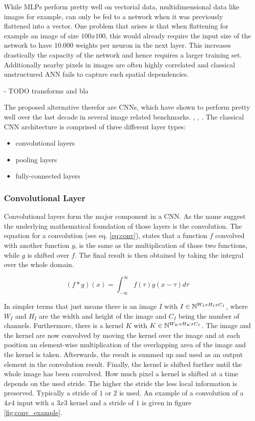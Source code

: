While \acp{MLP} perform pretty well on vectorial data, multidimensional data like images for example, can only be fed to a network when it was previously flattened into a vector.
One problem that arises is that when flattening for example an image of size $100x100$, this would already require the input size of the network to have $10.000$ weights per neuron in the next layer.
This increases drastically the capacity of the network and hence requires a larger training set.
Additionally nearby pixels in images are often highly correlated and classical unstructured \ac{ANN} fails to capture such spatial dependencies. \cite{lecun_lenet}

- TODO transforms and bla

The proposed alternative therefor are \acp{CNN}, which have shown to perform pretty well over the last decade in several image related benchmarks. \cite{inception}, \cite{resnet}, \cite{densenet}.
The classical \ac{CNN} architecture is comprised of three different layer types:

\begin{itemize}
    \item convolutional layers
    \item pooling layers
    \item fully-connected layers
\end{itemize}

\subsubsection{Convolutional Layer}
Convolutional layers form the major component in a \ac{CNN}.
As the name suggest the underlying mathematical foundation of those layers is the convolution.
The equation for a convolution (see eq. \ref{eq:conv}), states that a function $f$ convolved with another function $g$, is the same as the multiplication of those two functions, while $g$ is shifted over $f$.
The final result is then obtained by taking the integral over the whole domain. \cite{dl}

\begin{equation}
    (f * g)(x) = \int_{-\infty}^{\infty}f(\tau)g(x - \tau)d\tau
    \label{eq:conv}
\end{equation}

In simpler terms that just means there is an image $I$ with $I \in \mathbb{N}^{W_IxH_IxC_I}$, where $W_I$ and $H_I$ are the width and height of the image and $C_I$ being the number of channels.
Furthermore, there is a kernel $K$ with $K \in \mathbb{N}^{W_KxH_KxC_I}$.
The image and the kernel are now convolved by moving the kernel over the image and at each position an element-wise multiplication of the overlapping area of the image and the kernel is taken.
Afterwards, the result is summed up and used as an output element in the convolution result.
Finally, the kernel is shifted further until the whole image has been convolved.
How much pixel a kernel is shifted at a time depends on the used stride.
The higher the stride the less local information is preserved.
Typically a stride of $1$ or $2$ is used.
An example of a convolution of a $4x4$ input with a $3x3$ kernel and a stride of $1$ is given in figure \ref{fig:conv_example}.

